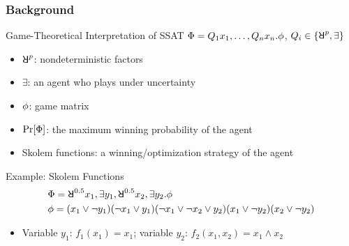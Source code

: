 \begin{frame}
      \frametitle{Background}
      \begin{block}{Game-Theoretical Interpretation of SSAT}
            $\Phi=Q_1 x_1,\ldots,Q_n x_n.\phi$, $Q_i \in \{\random{p},\exists\}$
            \pause
            \begin{itemize}
                  \item $\random{p}$: nondeterministic factors
                        \pause
                  \item $\exists$: an agent who plays under uncertainty
                        \pause
                  \item $\phi$: game matrix
                        \pause
                  \item $\Pr[\Phi]$: the maximum winning probability of the agent
                        \pause
                  \item \alert{Skolem functions}: a winning/optimization strategy of the agent
            \end{itemize}
      \end{block}\pause
      \begin{block}{Example: Skolem Functions}
            \abovedisplayskip=0pt
            \belowdisplayskip=0pt
            \begin{align*}
                   & \Qf=\random{0.5} x_1, \exists y_1, \random{0.5} x_2, \exists y_2. \pf \\
                   & \pf=(x_1 \lor \lnot y_1)
                  (\lnot x_1 \lor y_1)
                  (\lnot x_1 \lor \lnot x_2 \lor y_2)
                  (x_1 \lor \lnot y_2)
                  (x_2 \lor \lnot y_2)
            \end{align*}
            \pause
            \begin{itemize}
                  \item Variable $y_1$: $f_1(x_1)=x_1$; variable $y_2$: $f_2(x_1,x_2)=x_1 \land x_2$
            \end{itemize}
      \end{block}
\end{frame}